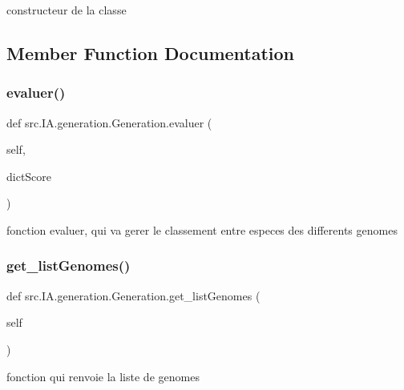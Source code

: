 constructeur de la classe 



\subsection{Member Function Documentation}
\mbox{\label{classsrc_1_1_i_a_1_1generation_1_1_generation_a78b1356928bb19d81bd0f231c8a64e1f}} 
\subsubsection{\texorpdfstring{evaluer()}{evaluer()}}
{\footnotesize\ttfamily def src.\+I\+A.\+generation.\+Generation.\+evaluer (\begin{DoxyParamCaption}\item[{}]{self,  }\item[{}]{dict\+Score }\end{DoxyParamCaption})}



fonction evaluer, qui va gerer le classement entre especes des differents genomes 

\mbox{\label{classsrc_1_1_i_a_1_1generation_1_1_generation_a9455cb1f619593f816b4fafc6745a9c3}} 
\subsubsection{\texorpdfstring{get\+\_\+list\+Genomes()}{get\_listGenomes()}}
{\footnotesize\ttfamily def src.\+I\+A.\+generation.\+Generation.\+get\+\_\+list\+Genomes (\begin{DoxyParamCaption}\item[{}]{self }\end{DoxyParamCaption})}



fonction qui renvoie la liste de genomes 

